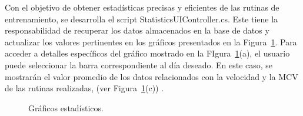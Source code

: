 Con el objetivo de obtener estadísticas precisas y eficientes de las rutinas de entrenamiento, se desarrolla el script StatisticsUIController.cs. Este tiene la responsabilidad de recuperar los datos almacenados en la base de datos y actualizar los valores pertinentes en los gráficos presentados en la Figura~\ref{fig: statics-graphs}. Para acceder a detalles específicos del gráfico mostrado en la FIgura~\ref{fig: statics-graphs}(a), el usuario puede seleccionar la barra correspondiente al día deseado. En este caso, se mostrarán el valor promedio de los datos relacionados con la velocidad y la MCV de las rutinas realizadas, (ver Figura~\ref{fig: statics-graphs}(c))  .

\begin{figure}[ht]
    \centering

    \caption{Gráficos estadísticos.}
    \label{fig: statics-graphs}
\end{figure}

